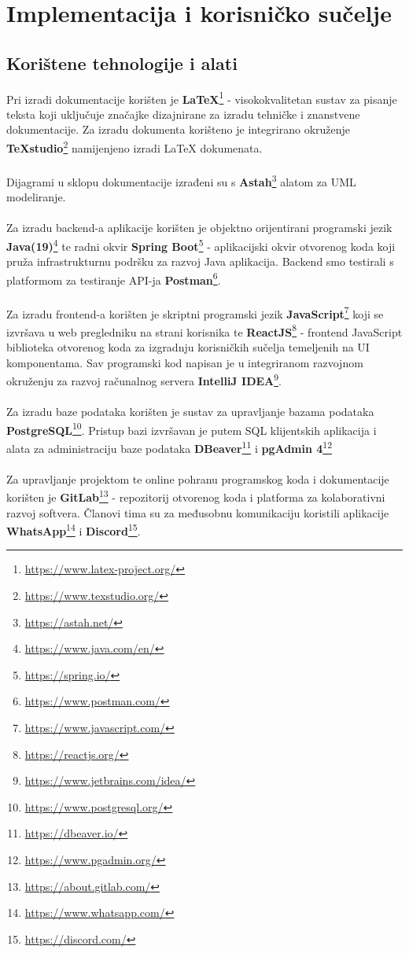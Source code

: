 \chapter{Implementacija i korisničko sučelje}


		\section{Korištene tehnologije i alati}

		Pri izradi dokumentacije korišten je \textbf{LaTeX}\footnote{\url{https://www.latex-project.org/}} - visokokvalitetan sustav za pisanje teksta koji uključuje značajke dizajnirane za izradu tehničke i znanstvene dokumentacije. Za izradu dokumenta korišteno je integrirano okruženje \textbf{TeXstudio}\footnote{\url{https://www.texstudio.org/}} namijenjeno izradi LaTeX dokumenata. \\ \\
			Dijagrami u sklopu dokumentacije izrađeni su s \textbf{Astah}\footnote{\url{https://astah.net/}} alatom za UML modeliranje. \\ \\
			Za izradu backend-a aplikacije korišten je objektno orijentirani programski jezik \textbf{Java(19)}\footnote{\url{https://www.java.com/en/}} te radni okvir \textbf{Spring Boot}\footnote{\url{https://spring.io/}} - aplikacijski okvir otvorenog koda koji pruža infrastrukturnu podršku za razvoj Java aplikacija. Backend smo testirali s platformom za testiranje API-ja \textbf{Postman}\footnote{\url{https://www.postman.com/}}. \\ \\
			 Za izradu frontend-a korišten je skriptni programski jezik \textbf{JavaScript}\footnote{\url{https://www.javascript.com/}} koji se izvršava u web pregledniku na strani korisnika te \textbf{ReactJS}\footnote{\url{https://reactjs.org/}} - frontend JavaScript biblioteka otvorenog koda za izgradnju korisničkih sučelja temeljenih na UI komponentama. Sav programski kod napisan je u integriranom razvojnom okruženju za razvoj računalnog servera \textbf{IntelliJ IDEA}\footnote{\url{https://www.jetbrains.com/idea/}}. \\ \\
			Za izradu baze podataka korišten je sustav za upravljanje bazama podataka \textbf{PostgreSQL}\footnote{\url{https://www.postgresql.org/}}. Pristup bazi izvršavan je putem SQL klijentskih aplikacija i alata za administraciju baze podataka \textbf{DBeaver}\footnote{\url{https://dbeaver.io/}} i \textbf{pgAdmin 4}\footnote{\url{https://www.pgadmin.org/}} \\ \\
			 Za upravljanje projektom te online pohranu programskog koda i dokumentacije korišten je \textbf{GitLab}\footnote{\url{https://about.gitlab.com/}} - repozitorij otvorenog koda i platforma za kolaborativni razvoj softvera. Članovi tima su za međusobnu komunikaciju koristili aplikacije \textbf{WhatsApp}\footnote{\url{https://www.whatsapp.com/}} i \textbf{Discord}\footnote{\url{https://discord.com/}}.

